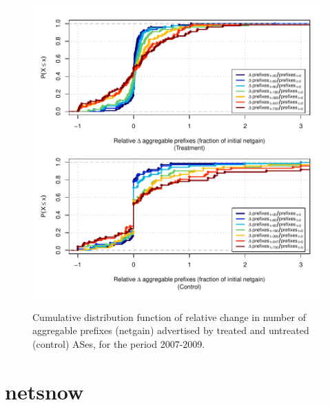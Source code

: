 \clearpage
\vspace*{16pt}
\begin{figure}[H]
\begin{centering}
\begin{singlespace}
\captionsetup{list=no}
    \includegraphics[width=6in]{figures/behavior-rel_netgain-2007_2009-corr.pdf}
    \vspace{-2em}\\
    \caption{Cumulative distribution function of relative change in number of
    aggregable prefixes (netgain) advertised by treated and untreated (control)
    ASes, for the period 2007-2009.}
\end{singlespace}
\end{centering}
\end{figure}


\clearpage
\section{netsnow}

